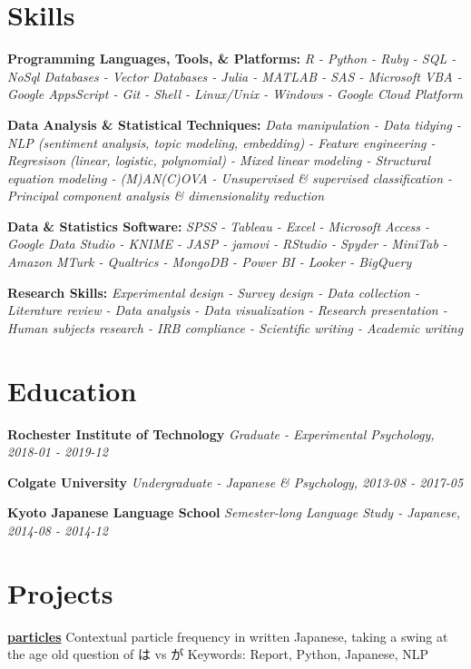 \documentclass[a4paper,9pt]{extarticle}
\begin{document}
\section*{Skills}

\noindent
\textbf{Programming Languages, Tools, \& Platforms:}
\textit{R - Python - Ruby - SQL - NoSql Databases - Vector Databases - Julia - MATLAB - SAS - Microsoft VBA - Google AppsScript - Git - Shell - Linux/Unix - Windows - Google Cloud Platform}

\noindent
\textbf{Data Analysis \& Statistical Techniques:}
\textit{Data manipulation - Data tidying - NLP (sentiment analysis, topic modeling, embedding) - Feature engineering - Regresison (linear, logistic, polynomial) - Mixed linear modeling - Structural equation modeling - (M)AN(C)OVA - Unsupervised \& supervised classification - Principal component analysis \& dimensionality reduction}

\noindent
\textbf{Data \& Statistics Software:}
\textit{SPSS - Tableau - Excel - Microsoft Access - Google Data Studio - KNIME - JASP - jamovi - RStudio - Spyder - MiniTab - Amazon MTurk - Qualtrics - MongoDB - Power BI - Looker - BigQuery}

\noindent
\textbf{Research Skills:}
\textit{Experimental design - Survey design - Data collection - Literature review - Data analysis - Data visualization - Research presentation - Human subjects research - IRB compliance - Scientific writing - Academic writing}

\section*{Education}

\noindent
\textbf{Rochester Institute of Technology}
\textit{Graduate - Experimental Psychology, 2018-01 - 2019-12}

\noindent
\textbf{Colgate University}
\textit{Undergraduate - Japanese \& Psychology, 2013-08 - 2017-05}

\noindent
\textbf{Kyoto Japanese Language School}
\textit{Semester-long Language Study - Japanese, 2014-08 - 2014-12}

\section*{Projects}

\noindent
\textbf{\href{https://github.com/ryancahildebrandt/particles}{particles}}
Contextual particle frequency in written Japanese, taking a swing at the age old question of は vs が
Keywords: Report, Python, Japanese, NLP
\end{document}
